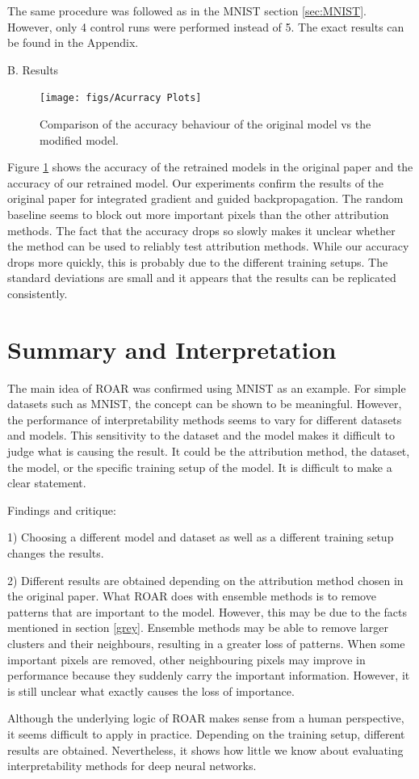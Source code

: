 The same procedure was followed as in the MNIST section \ref{sec:MNIST}. However, only 4 control runs were performed instead of 5. The exact results can be found in the Appendix.

B. Results

\begin{figure}[H]
	\centering
	\texttt{[image: figs/Acurracy Plots]}
	\caption {Comparison of the accuracy behaviour of the original model vs the modified model.}
	\label{fig:food101Res}
\end{figure}

Figure \ref{fig:food101Res} shows the accuracy of the retrained models in the original paper and the accuracy of our retrained model. Our experiments confirm the results of the original paper for integrated gradient and guided backpropagation. The random baseline seems to block out more important pixels than the other attribution methods. The fact that the accuracy drops so slowly makes it unclear whether the method can be used to reliably test attribution methods. While our accuracy drops more quickly, this is probably due to the different training setups. The standard deviations are small and it appears that the results can be replicated consistently.

\section{Summary and Interpretation}

The main idea of ROAR was confirmed using MNIST as an example. For simple datasets such as MNIST, the concept can be shown to be meaningful. However, the performance of interpretability methods seems to vary for different datasets and models. This sensitivity to the dataset and the model makes it difficult to judge what is causing the result. It could be the attribution method, the dataset, the model, or the specific training setup of the model. It is difficult to make a clear statement.

Findings and critique:

1) Choosing a different model and dataset as well as a different training setup changes the results. 

2) Different results are obtained depending on the attribution method chosen in the original paper. What ROAR does with ensemble methods is to remove patterns that are important to the model. However, this may be due to the facts mentioned in section \ref{grey}. Ensemble methods may be able to remove larger clusters and their neighbours, resulting in a greater loss of patterns. When some important pixels are removed, other neighbouring pixels may improve in performance because they suddenly carry the important information. However, it is still unclear what exactly causes the loss of importance.

Although the underlying logic of ROAR makes sense from a human perspective, it seems difficult to apply in practice. Depending on the training setup, different results are obtained. Nevertheless, it shows how little we know about evaluating interpretability methods for deep neural networks.


